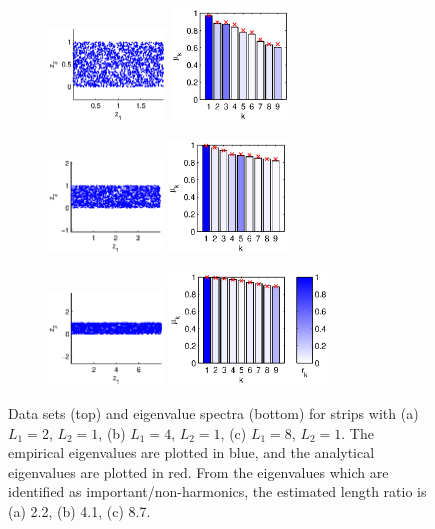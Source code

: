\documentclass[preprint]{elsarticle}
\begin{document}
\begin{figure}[t]
\centering
\begin{subfigure}{0.3\textwidth}
\includegraphics[height=2.5cm]{strip_data_L2}
\includegraphics[height=3cm]{strip_spectrum_L2}
\caption{}
\end{subfigure}
%
\hfill
%
\begin{subfigure}{0.3\textwidth}
\includegraphics[height=2.5cm]{strip_data_L4}
\includegraphics[height=3cm]{strip_spectrum_L4}
\caption{}
\end{subfigure}
%
\hfill
%
\begin{subfigure}{0.35\textwidth}
\includegraphics[height=2.5cm]{strip_data_L8}
\includegraphics[height=3cm]{strip_spectrum_L8}
\caption{}
\end{subfigure}
%
\caption{Data sets (top) and eigenvalue spectra (bottom) for strips with (a) $L_1 = 2$, $L_2 = 1$, (b) $L_1 = 4$, $L_2 = 1$, (c) $L_1 = 8$, $L_2 = 1$. The empirical eigenvalues are plotted in blue, and the analytical eigenvalues are plotted in red. From the eigenvalues which are identified as important/non-harmonics, the estimated length ratio is (a) 2.2, (b) 4.1, (c) 8.7.}
\label{fig:strip_compare_analytic}
\end{figure}
\end{document}

